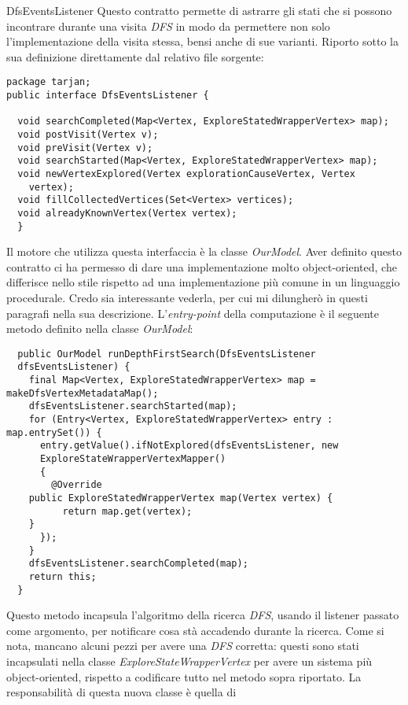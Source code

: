 \begin{paragraph}{DfsEventsListener}
Questo contratto permette di astrarre gli stati che si possono
incontrare durante una visita \emph{DFS} in modo da permettere non
solo l'implementazione della visita stessa, bensi anche di sue
varianti. Riporto sotto la sua definizione direttamente dal relativo
file sorgente:

\begin{lstlisting}
package tarjan; 
public interface DfsEventsListener {

  void searchCompleted(Map<Vertex, ExploreStatedWrapperVertex> map);
  void postVisit(Vertex v);
  void preVisit(Vertex v);
  void searchStarted(Map<Vertex, ExploreStatedWrapperVertex> map);
  void newVertexExplored(Vertex explorationCauseVertex, Vertex
    vertex);
  void fillCollectedVertices(Set<Vertex> vertices);
  void alreadyKnownVertex(Vertex vertex);
  }
\end{lstlisting}
Il motore che utilizza questa interfaccia \`e la classe
\emph{OurModel}. Aver definito questo contratto ci ha permesso di dare
una implementazione molto object-oriented, che differisce nello stile
rispetto ad una implementazione pi\`u comune in un linguaggio
procedurale. Credo sia interessante vederla, per cui mi dilungher\`o
in questi paragrafi nella sua descrizione. L'\emph{entry-point} della
computazione \`e il seguente metodo definito nella classe
\emph{OurModel}:
\begin{lstlisting}
  public OurModel runDepthFirstSearch(DfsEventsListener
  dfsEventsListener) { 
    final Map<Vertex, ExploreStatedWrapperVertex> map = makeDfsVertexMetadataMap();
    dfsEventsListener.searchStarted(map);
    for (Entry<Vertex, ExploreStatedWrapperVertex> entry : map.entrySet()) {
      entry.getValue().ifNotExplored(dfsEventsListener,	new
      ExploreStateWrapperVertexMapper() 
      {
        @Override
	public ExploreStatedWrapperVertex map(Vertex vertex) {
          return map.get(vertex);
	}
      });
    }
    dfsEventsListener.searchCompleted(map);
    return this;
  }
\end{lstlisting}
Questo metodo incapsula l'algoritmo della ricerca \emph{DFS}, usando
il listener passato come argomento, per notificare cosa st\`a
accadendo durante la ricerca. Come si nota, mancano alcuni pezzi per
avere una \emph{DFS} corretta: questi sono stati incapsulati nella
classe \emph{ExploreStateWrapperVertex} per avere un sistema pi\`u
object-oriented, rispetto a codificare tutto nel metodo sopra
riportato. La responsabilit\`a di questa nuova classe \`e quella di

\end{paragraph}
